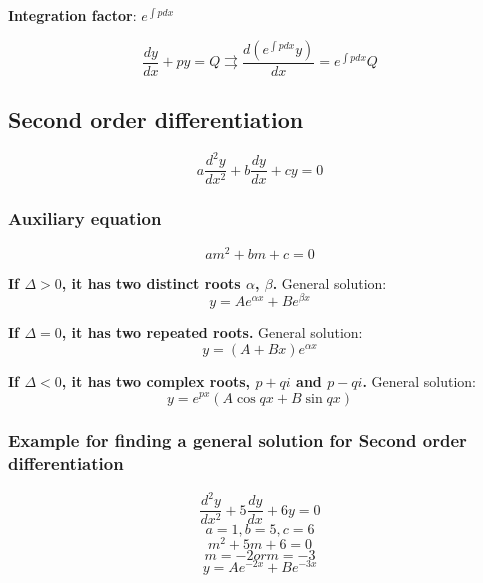 \documentclass[a4paper,9pt]{scrartcl}
\begin{document}
    \textbf{Integration factor}: $\boxed{e^{\int{p}dx}}$

    \begin{displaymath}
        \frac{dy}{dx}+py=Q \rightrightarrows \frac{d(\boxed{e^{\int{p}dx}}y)}{dx} = \boxed{e^{\int{p}dx}} Q
    \end{displaymath}

    \subsection{Second order differentiation}

    \begin{displaymath}
        a\frac{d^{2}y}{dx^2} + b\frac{dy}{dx} + cy = 0
    \end{displaymath}

    \subsubsection{Auxiliary equation}
    \begin{displaymath}
        am^2 + bm + c = 0
    \end{displaymath}

    \textbf{If $\Delta > 0$, it has two distinct roots $\alpha$, $\beta$.}
    General solution:
    \begin{displaymath}
        y = Ae^{{\alpha}x} + Be^{{\beta}x}
    \end{displaymath}

    \textbf{If $\Delta = 0$, it has two repeated roots.}
    General solution:
    \begin{displaymath}
        y = (A+Bx)e^{{\alpha}x}
    \end{displaymath}

    \textbf{If $\Delta < 0$, it has two complex roots, $p + qi$ and $p - qi$. }
    General solution:
    \begin{displaymath}
        y = e^{px}(A\cos{qx}+B\sin{qx})
    \end{displaymath}

    \subsubsection{Example for finding a general solution for Second order differentiation}

    \begin{displaymath}
        \frac{d^{2}y}{dx^2} + 5\frac{dy}{dx} + 6y = 0
    \end{displaymath}
    \begin{displaymath}
        a = 1, b = 5, c = 6
    \end{displaymath}
    \begin{displaymath}
        m^2 + 5m + 6 = 0
    \end{displaymath}
    \begin{displaymath}
        m = -2 or m = -3
    \end{displaymath}
    \begin{displaymath}
        y = Ae^{-2x}+Be^{-3x}
    \end{displaymath}
\end{document}
